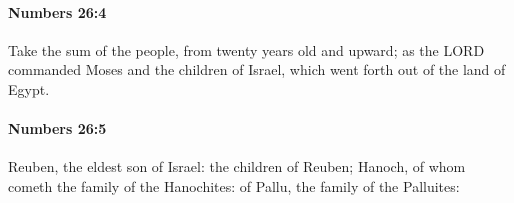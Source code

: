 		\paragraph{Numbers 26:4} %
			\label{NUMBERS-26-4}

			Take the sum of the people, from twenty years old and upward; as the LORD commanded Moses and the children of Israel, which went forth out of the land of Egypt.


		\paragraph{Numbers 26:5} %
			\label{NUMBERS-26-5}

			Reuben, the eldest son of Israel: the children of Reuben; Hanoch, of whom cometh the family of the Hanochites: of Pallu, the family of the Palluites:


